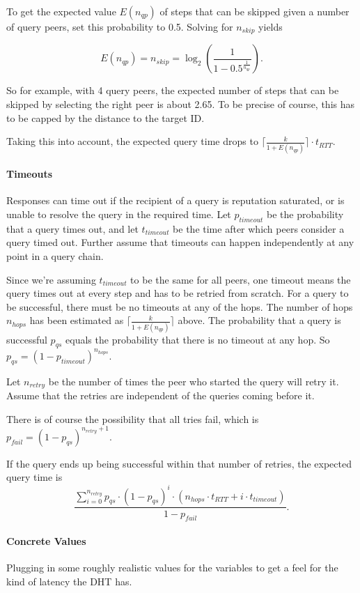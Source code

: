 To get the expected value $E(n_{qp})$ of steps that can be skipped given a
number of query peers, set this probability to 0.5. Solving for $n_{skip}$
yields

\[E(n_{qp}) = n_{skip} = \log_2\left(\frac{1}{1 -
0.5^{\frac{1}{n_{qp}}}}\right).\]

So for example, with 4 query peers, the expected number of steps that can be
skipped by selecting the right peer is about 2.65. To be precise of course, this
has to be capped by the distance to the target ID.

Taking this into account, the expected query time drops to $\lceil\frac{k}{1 +
E(n_{qp})}\rceil \cdot t_{RTT}$.

\paragraph{Timeouts}
Responses can time out if the recipient of a query is reputation saturated, or
is unable to resolve the query in the required time. Let $p_{timeout}$ be the
probability that a query times out, and let $t_{timeout}$ be the time after
which peers consider a query timed out. Further assume that timeouts can happen
independently at any point in a query chain.

Since we're assuming $t_{timeout}$ to be the same for all peers, one timeout
means the query times out at every step and has to be retried from scratch. For
a query to be successful, there must be no timeouts at any of the hops. The
number of hops $n_{hops}$ has been estimated as $\lceil\frac{k}{1 +
E(n_{qp})}\rceil$ above. The probability that a query is successful $p_{qs}$
equals the probability that there is no timeout at any hop. So $p_{qs} = (1 -
p_{timeout})^{n_{hops}}$.

Let $n_{retry}$ be the number of times the peer who started the query will retry
it. Assume that the retries are independent of the queries coming
before it.

There is of course the possibility that all tries fail, which is $p_{fail} = (1
- p_{qs})^{n_{retry} + 1}$.

If the query ends up being successful within that number of retries,
the expected query time is
\[\frac{\sum_{i = 0}^{n_{retry}}p_{qs} \cdot (1 - p_{qs})^i \cdot (n_{hops}
\cdot t_{RTT} + i \cdot t_{timeout})}{1 - p_{fail}}.\]

\paragraph{Concrete Values}
Plugging in some roughly realistic values for the variables to get a feel for
the kind of latency the DHT has.

